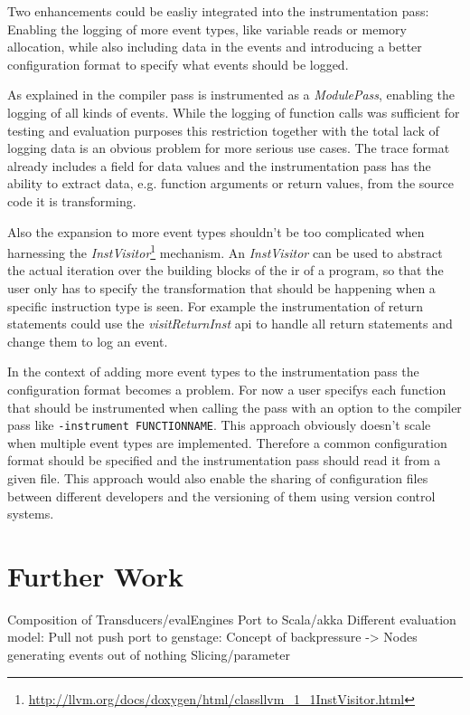 Two enhancements could be easliy integrated into the instrumentation pass:
Enabling the logging of more event types, like variable reads or memory allocation, while also including data in the events and introducing a better configuration format to specify what events should be logged.

As explained in  the compiler pass is instrumented as a \emph{ModulePass}, enabling the logging of all kinds of events.
While the logging of function calls was sufficient for testing and evaluation purposes this restriction together with the total lack of logging data is an obvious problem for more serious use cases.
The trace format already includes a field for data values and the instrumentation pass has the ability to extract data, e.g. function arguments or return values, from the source code it is transforming.

Also the expansion to more event types shouldn't be too complicated when harnessing the \emph{InstVisitor}\footnote{\url{http://llvm.org/docs/doxygen/html/classllvm_1_1InstVisitor.html}} mechanism.
An \emph{InstVisitor} can be used to abstract the actual iteration over the building blocks of the \gls{ir} of a program, so that the user only has to specify the transformation that should be happening when a specific instruction type is seen.
For example the instrumentation of return statements could use the \emph{visitReturnInst} \gls{api} to handle all return statements and change them to log an event.

In the context of adding more event types to the instrumentation pass the configuration format becomes a problem.
For now a user specifys each function that should be instrumented when calling the pass with an option to the compiler pass like \lstinline{-instrument FUNCTIONNAME}.
This approach obviously doesn't scale when multiple event types are implemented.
Therefore a common configuration format should be specified and the instrumentation pass should read it from a given file.
This approach would also enable the sharing of configuration files between different developers and the versioning of them using version control systems.

\section{Further Work}
\label{sec:conclusion:further_work}

Composition of Transducers/evalEngines
Port to Scala/akka
Different evaluation model: Pull not push
  port to genstage: Concept of backpressure -> Nodes generating events out of nothing
Slicing/parameter


